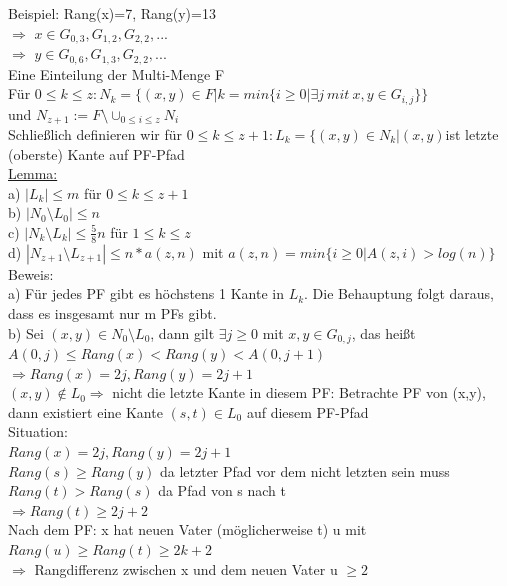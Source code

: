 \documentclass[a4paper]{article}
\begin{document}
Beispiel: Rang(x)=7, Rang(y)=13\\
$\Rightarrow$ $x\in G_{0,3},G_{1,2},G_{2,2},...$\\
$\Rightarrow$ $y\in G_{0,6},G_{1,3},G_{2,2},...$\\
Eine Einteilung der Multi-Menge F \\
Für $0\leq k \leq z: N_k=\lbrace (x,y)\in F | k=min\lbrace i\geq 0|\exists j\ mit\ x,y\in G_{i,j}\rbrace\rbrace$\\
und $N_{z+1} := F\setminus\cup_{0\leq i\leq z} N_i$\\
Schließlich definieren wir für $0\leq k\leq z+1: L_k=\lbrace(x,y)\in N_k | (x,y) $ist letzte (oberste) Kante auf PF-Pfad\\
\underline{Lemma:}\\
a) $|L_k| \leq m$ für $0\leq k \leq z+1$\\
b) $|N_0\setminus L_0|\leq n$\\
c) $|N_k\setminus L_k | \leq \frac{5}{8}n$ für $1\leq k \leq z$\\
d) $|N_{z+1}\setminus L_{z+1} | \leq n*a(z,n)$ mit $a(z,n) = min\lbrace i\geq 0 | A(z,i) > log(n)\rbrace$\\
Beweis:\\
a) Für jedes PF gibt es höchstens 1 Kante in $L_k$. Die Behauptung folgt daraus, dass es insgesamt nur m PFs gibt.\\
b) Sei $(x,y)\in N_0\setminus L_0$, dann gilt $\exists j\geq 0$ mit $x,y \in G_{0,j}$, das heißt $A(0,j) \leq Rang(x) < Rang(y) < A(0,j+1)$\\
\hspace*{1cm}$\Rightarrow Rang(x)=2j, Rang(y)=2j+1$\\
\hspace*{1cm}$(x,y) \not\in L_0 \Rightarrow $ nicht die letzte Kante in diesem PF: Betrachte PF von (x,y), dann existiert eine Kante $(s,t)\in L_0$ auf diesem PF-Pfad\\
Situation:\\
$Rang(x)=2j, Rang(y)=2j+1$\\
$Rang(s)\geq Rang(y)$ da letzter Pfad vor dem nicht letzten sein muss\\
$Rang(t) > Rang(s)$ da Pfad von s nach t\\
$\Rightarrow Rang(t) \geq 2j+2$\\
Nach dem PF: x hat neuen Vater (möglicherweise t) u mit $Rang(u)\geq Rang(t)\geq 2k+2$\\
$\Rightarrow$ Rangdifferenz zwischen x und dem neuen Vater u $\geq 2$\\
\end{document}
